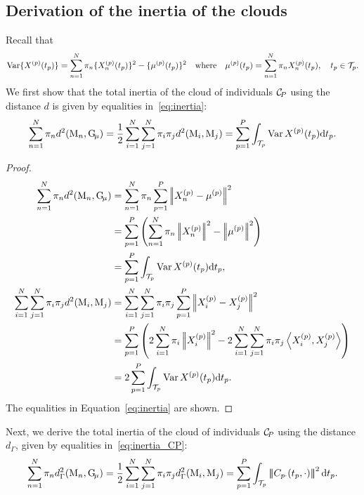 
\subsection{Derivation of the inertia of the clouds} %
\label{sub:derivation_of_the_inertia_of_the_clouds}

Recall that 
\begin{equation}\label{eq:var_appendix}
    \operatorname{Var}\{X^{(p)}(t_p)\} = \sum_{n = 1}^N \pi_n \{X_n^{(p)}(t_p)\}^2 - \{\mu^{(p)}(t_p)\}^2 \quad\text{where}\quad \mu^{(p)}(t_p) = \sum_{n = 1}^N \pi_nX_n^{(p)}(t_p), \quad t_p \in \mathcal{T}_{p}.
\end{equation}
We first show that the total inertia of the cloud of individuals $\mathcal{C}_{\!P}$ using the distance $d$ is given by equalities in~\eqref{eq:inertia}:
$$\sum_{n = 1}^N \pi_n d^2(\mathrm{M}_n, \mathrm{G}_{\!\mu}) = \frac{1}{2}\sum_{i = 1}^N \sum_{j = 1}^N \pi_i \pi_j d^2(\mathrm{M}_i, \mathrm{M}_j) = \sum_{p = 1}^P \int_{\mathcal{T}_{p}}\operatorname{Var}{X^{(p)}(t_p)} {\rm d} t_p.$$

\begin{proof}
    \begin{align*}
    \sum_{n = 1}^N \pi_n d^2(\pobs{M}_n, \Gmu) 
    &= \sum_{n = 1}^N \pi_n \sum_{p = 1}^P\normLp{\Xnp - \mu^{(p)}}^2\\
    &= \sum_{p = 1}^P\left(\sum_{n = 1}^N \pi_n \normLp{\Xnp}^2 - \normLp{\mup{p}}^2\right) \\
    &= \sum_{p = 1}^P \int_{\TT{p}}\Var{\Xp{p}(t_p)} \dd t_p, \\
\sum_{i = 1}^N \sum_{j = 1}^N \pi_i \pi_j d^2(\pobs{M}_i, \pobs{M}_j) &= \sum_{i = 1}^N \sum_{j = 1}^N \pi_i \pi_j \sum_{p = 1}^P \normLp{\Xp{p}_i - \Xp{p}_j}^2\\
    &= \sum_{p = 1}^P \left(2\sum_{i = 1}^N \pi_i\normLp{\Xp{p}_i}^2 - 2\sum_{i = 1}^N \sum_{j = 1}^N \pi_i\pi_j\inLp{\Xp{p}_i}{\Xp{p}_j}\right) \\
    &= 2\sum_{p = 1}^P \int_{\TT{p}}\Var{\Xp{p}(t_p)} \dd t_p.
\end{align*}
The equalities in Equation~\eqref{eq:inertia} are shown.
\end{proof}
Next, we derive the total inertia of the cloud of individuals $\mathcal{C}_{\!P}$ using the distance $d_\Gamma$, given by equalities in~\eqref{eq:inertia_CP}:
$$\sum_{n = 1}^N \pi_n d_\Gamma^2(\mathrm{M}_n, \mathrm{G}_{\!\mu}) = \frac{1}{2}\sum_{i = 1}^N \sum_{j = 1}^N \pi_i \pi_j d_\Gamma^2(\mathrm{M}_i, \mathrm{M}_j) = \sum_{p = 1}^P \int_{\mathcal{T}_{p}} \left|\!\left|\!\left|C_{p \cdot}(t_p, \cdot)\right|\!\right|\!\right|^2 {\rm d} t_p. $$

